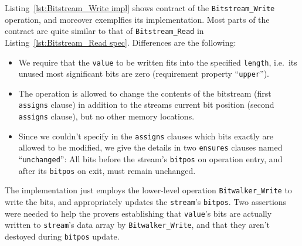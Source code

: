 Listing~\ref{lst:Bitstream_Write impl} shows contract of
the \lstinline{Bitstream_Write} operation,
and moreover exemplfies its implementation.
%
Most parts of the contract are quite similar to that of
\lstinline{Bitstream_Read} in
Listing~\ref{lst:Bitstream_Read spec}.
%
Differences are the following:
\begin{itemize}
\item We require that the \lstinline{value} to be written fits into
	the specified
	\lstinline{length}, i.e.\ its unused most significant bits
	are zero (requirement property
	``\lstinline{upper}'').
\item The operation is allowed to change the contents of the bitstream
	(first \lstinline{assigns} clause) in addition to the streams
	current bit
	position (second \lstinline{assigns} clause), but no other
	memory locations.
\item Since we couldn't specify in the \lstinline{assigns} clauses 
	which bits exactly are allowed to be modified, we give the
	details in two
	\lstinline{ensures} clauses named ``\lstinline{unchanged}'':
	All bits before the stream's \lstinline{bitpos} on operation
	entry, and after
	its \lstinline{bitpos} on exit, must remain unchanged.
\end{itemize}

The implementation just employs the lower-level operation
\lstinline{Bitwalker_Write} to
write the bits, and appropriately updates the \lstinline{stream}'s
\lstinline{bitpos}.
%
Two assertions were needed to help the provers establishing that
\lstinline{value}'s
bits are actually written to \lstinline{stream}'s data array by
\lstinline{Bitwalker_Write}, and that they aren't destoyed during
\lstinline{bitpos} update.




